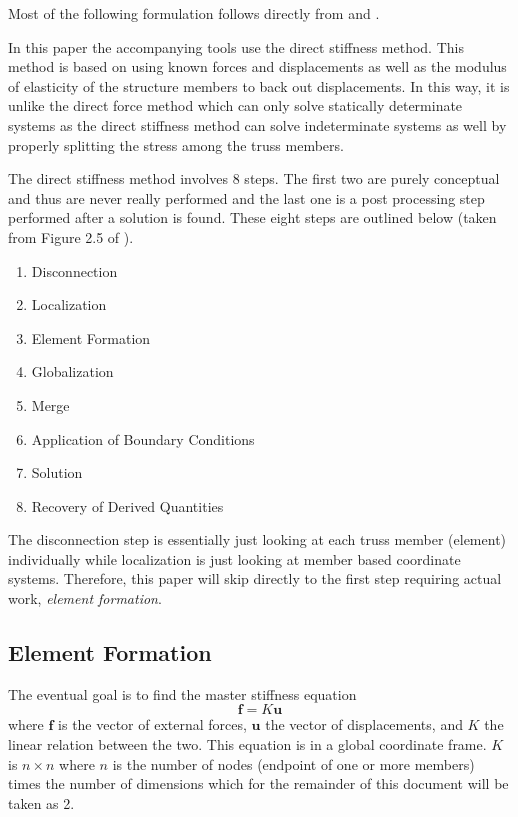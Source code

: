 \documentclass{article}
\begin{document}
Most of the following formulation follows directly from
\parencite{felippa2004ch2} and \parencite{felippa2004ch3}.

In this paper the accompanying tools use the direct stiffness method.  This
method is based on using known forces and displacements as well as the modulus
of elasticity of the structure members to back out displacements.  In this
way, it is unlike the direct force method which can only solve statically
determinate systems as the direct stiffness method can solve indeterminate
systems as well by properly splitting the stress among the truss members.

The direct stiffness method involves 8 steps.  The first two are purely
conceptual and thus are never really performed and the last one is a post
processing step performed after a solution is found.  These eight steps are
outlined below (taken from Figure 2.5 of \cite{felippa2004ch2}).
\begin{enumerate}[noitemsep]
    \item Disconnection
    \item Localization
    \item Element Formation
    \item Globalization
    \item Merge
    \item Application of Boundary Conditions
    \item Solution
    \item Recovery of Derived Quantities
\end{enumerate}

The disconnection step is essentially just looking at each truss member
(element) individually while localization is just looking at member based
coordinate systems.  Therefore, this paper will skip directly to the first
step requiring actual work, \emph{element formation}.




\subsection{Element Formation}

The eventual goal is to find the master stiffness equation
\begin{equation}
    \mathbf{f}=K\mathbf{u} \label{eq:master_stiffness_equation}
\end{equation}
where $\mathbf{f}$ is the vector of external forces, $\mathbf{u}$ the vector
of displacements, and $K$ the linear relation between the two.  This equation
is in a global coordinate frame.  $K$ is $n\times{}n$ where $n$ is the number
of nodes (endpoint of one or more members) times the number of dimensions
which for the remainder of this document will be taken as 2.
\end{document}
